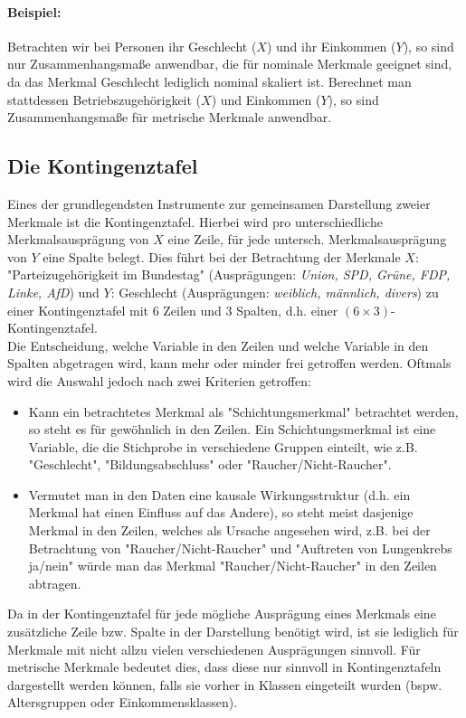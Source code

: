 \documentclass[a4paper]{article}
\begin{document}
\noindent \paragraph{Beispiel:} Betrachten wir bei Personen ihr Geschlecht ($X$) und ihr Einkommen ($Y$), so sind nur Zusammenhangsmaße anwendbar, die für nominale Merkmale geeignet sind, da das Merkmal Geschlecht lediglich nominal skaliert ist. Berechnet man stattdessen Betriebszugehörigkeit ($X$) und Einkommen ($Y$), so sind Zusammenhangsmaße für metrische Merkmale anwendbar.

\subsection{Die Kontingenztafel}\label{sec:kont}
Eines der grundlegendsten Instrumente zur gemeinsamen Darstellung zweier Merkmale ist die Kontingenztafel.
Hierbei wird pro unterschiedliche Merkmalsausprägung von $X$ eine Zeile, für jede untersch. Merkmalsausprägung von $Y$ eine Spalte belegt. Dies führt bei der Betrachtung der Merkmale $X$: "Parteizugehörigkeit im Bundestag" (Ausprägungen: \textit{Union, SPD, Grüne, FDP, Linke, AfD}) und $Y$: Geschlecht (Ausprägungen: \textit{weiblich, männlich, divers}) zu einer Kontingenztafel mit 6 Zeilen und 3 Spalten, d.h. einer $(6\times3)$-Kontingenztafel.\\
Die Entscheidung, welche Variable in den Zeilen und welche Variable in den Spalten abgetragen wird, kann mehr oder minder frei getroffen werden. Oftmals wird die Auswahl jedoch nach zwei Kriterien getroffen:
\begin{itemize}
    \item Kann ein betrachtetes Merkmal als "Schichtungsmerkmal" betrachtet werden, so steht es für gewöhnlich in den Zeilen. Ein Schichtungsmerkmal ist eine Variable, die die Stichprobe in verschiedene Gruppen einteilt, wie z.B. "Geschlecht", "Bildungsabschluss" oder "Raucher/Nicht-Raucher".
    \item Vermutet man in den Daten eine kausale Wirkungsstruktur (d.h. ein Merkmal hat einen Einfluss auf das Andere), so steht meist dasjenige Merkmal in den Zeilen, welches als Ursache angesehen wird, z.B.
    bei der Betrachtung von "Raucher/Nicht-Raucher" und "Auftreten von Lungenkrebs ja/nein" würde man das Merkmal "Raucher/Nicht-Raucher" in den Zeilen abtragen.
\end{itemize}
Da in der Kontingenztafel für jede mögliche Ausprägung eines Merkmals eine zusätzliche Zeile bzw. Spalte in der Darstellung benötigt wird, ist sie lediglich für Merkmale mit nicht allzu vielen verschiedenen Ausprägungen sinnvoll. Für metrische Merkmale bedeutet dies, dass diese nur sinnvoll in Kontingenztafeln dargestellt werden können, falls sie vorher in Klassen eingeteilt wurden (bspw. Altersgruppen oder Einkommensklassen).\\
\end{document}
